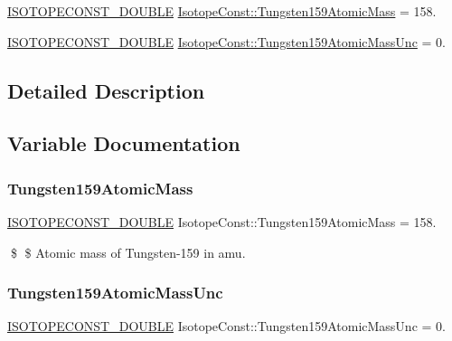 \begin{DoxyCompactItemize}
\item 
\mbox{\hyperlink{group___isotope_const-_macros_ga8f45a7272ce02c0b4c65c44636ed719a}{I\+S\+O\+T\+O\+P\+E\+C\+O\+N\+S\+T\+\_\+\+D\+O\+U\+B\+LE}} \mbox{\hyperlink{group___isotope_const-_tungsten-_w159_ga668487d1b64bd0463213a6f77448a475}{Isotope\+Const\+::\+Tungsten159\+Atomic\+Mass}} = 158.
\item 
\mbox{\hyperlink{group___isotope_const-_macros_ga8f45a7272ce02c0b4c65c44636ed719a}{I\+S\+O\+T\+O\+P\+E\+C\+O\+N\+S\+T\+\_\+\+D\+O\+U\+B\+LE}} \mbox{\hyperlink{group___isotope_const-_tungsten-_w159_gab98c60903043bb0a7228bffdec2dd481}{Isotope\+Const\+::\+Tungsten159\+Atomic\+Mass\+Unc}} = 0.
\end{DoxyCompactItemize}


\subsection{Detailed Description}


\subsection{Variable Documentation}
\mbox{\label{group___isotope_const-_tungsten-_w159_ga668487d1b64bd0463213a6f77448a475}} 
\subsubsection{\texorpdfstring{Tungsten159\+Atomic\+Mass}{Tungsten159AtomicMass}}
{\footnotesize\ttfamily \mbox{\hyperlink{group___isotope_const-_macros_ga8f45a7272ce02c0b4c65c44636ed719a}{I\+S\+O\+T\+O\+P\+E\+C\+O\+N\+S\+T\+\_\+\+D\+O\+U\+B\+LE}} Isotope\+Const\+::\+Tungsten159\+Atomic\+Mass = 158.}

\$ \$ Atomic mass of Tungsten-\/159 in amu. \mbox{\label{group___isotope_const-_tungsten-_w159_gab98c60903043bb0a7228bffdec2dd481}} 
\subsubsection{\texorpdfstring{Tungsten159\+Atomic\+Mass\+Unc}{Tungsten159AtomicMassUnc}}
{\footnotesize\ttfamily \mbox{\hyperlink{group___isotope_const-_macros_ga8f45a7272ce02c0b4c65c44636ed719a}{I\+S\+O\+T\+O\+P\+E\+C\+O\+N\+S\+T\+\_\+\+D\+O\+U\+B\+LE}} Isotope\+Const\+::\+Tungsten159\+Atomic\+Mass\+Unc = 0.}

